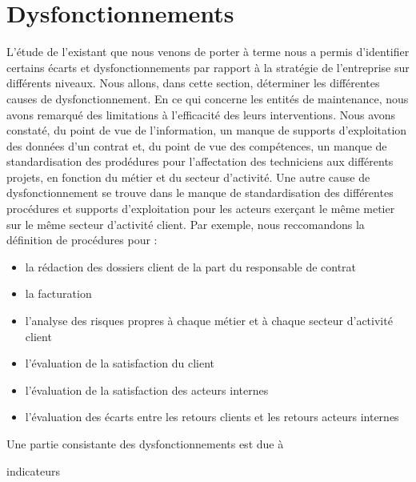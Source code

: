 \section{Dysfonctionnements}
L'étude de l'existant que nous venons de porter à terme nous a permis d'identifier certains écarts et dysfonctionnements par rapport à la stratégie de l'entreprise sur différents niveaux. Nous allons, dans cette section, déterminer les différentes causes de dysfonctionnement.
En ce qui concerne les entités de maintenance, nous avons remarqué des limitations à l'efficacité des leurs interventions. Nous avons constaté, du point de vue de l'information, un manque de supports d'exploitation des données d'un contrat et, du point de vue des compétences, un manque de standardisation des prodédures pour l'affectation des techniciens aux différents projets, en fonction du métier et du secteur d'activité.
Une autre cause de dysfonctionnement se trouve dans le manque de standardisation des différentes procédures et supports d'exploitation pour les acteurs exerçant le même metier sur le même secteur d'activité client. Par exemple, nous reccomandons la définition de procédures pour :
\begin{itemize}
\item la rédaction des dossiers client de la part du responsable de contrat
\item la facturation
\item l'analyse des risques propres à chaque métier et à chaque secteur d'activité client
\item l'évaluation de la satisfaction du client
\item l'évaluation de la satisfaction des acteurs internes
\item l'évaluation des écarts entre les retours clients et les retours acteurs internes
\end{itemize}
Une partie consistante des dysfonctionnements est due à 

indicateurs

